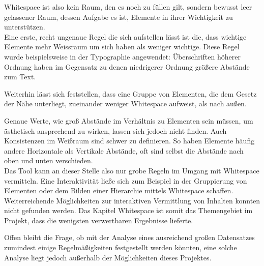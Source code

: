 Whitespace ist also kein Raum, den es noch zu füllen gilt, sondern bewusst leer gelassener Raum, dessen Aufgabe es ist, Elemente in ihrer Wichtigkeit zu unterstützen. \\
Eine erste, recht ungenaue Regel die sich aufstellen lässt ist die, dass wichtige Elemente mehr Weissraum um sich haben als weniger wichtige. Diese Regel wurde beispielsweise in der Typographie angewendet: Überschriften höherer Ordnung haben im Gegensatz zu denen niedrigerer Ordnung größere Abstände zum Text.

Weiterhin lässt sich feststellen, dass eine Gruppe von Elementen, die dem Gesetz der Nähe \cite{mayer2005einfuhrung} unterliegt, zueinander weniger Whitespace aufweist, als nach außen.

Genaue Werte, wie groß Abstände im Verhältnis zu Elementen sein müssen, um ästhetisch ansprechend zu wirken, lassen sich jedoch nicht finden. Auch Konsistenzen im Weißraum sind schwer zu definieren. So haben Elemente häufig andere Horizontale als Vertikale Abstände, oft sind selbst die Abstände nach oben und unten verschieden. \\
Das Tool kann an dieser Stelle also nur grobe Regeln im Umgang mit Whitespace vermitteln. Eine Interaktivität ließe sich zum Beispiel in der Gruppierung von Elementen oder dem Bilden einer Hierarchie mittels Whitespace schaffen. Weiterreichende Möglichkeiten zur interaktiven Vermittlung von Inhalten konnten nicht gefunden werden. Das Kapitel Whitespace ist somit das Themengebiet im Projekt, dass die wenigsten verwertbaren Ergebnisse lieferte.

Offen bleibt die Frage, ob mit der Analyse eines ausreichend großen Datensatzes zumindest einige Regelmäßigkeiten festgestellt werden könnten, eine solche Analyse liegt jedoch außerhalb der Möglichkeiten dieses Projektes.

\clearpage
